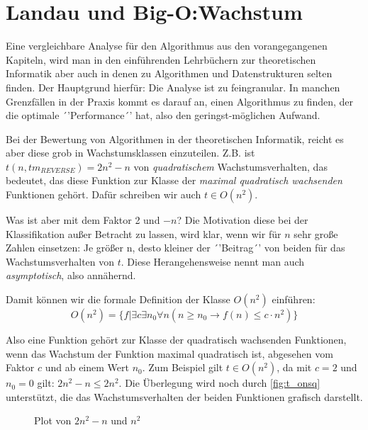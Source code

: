 \section{Landau und Big-O:\@ Wachstum}

Eine vergleichbare Analyse für den Algorithmus aus den vorangegangenen Kapiteln,
wird man in den einführenden Lehrbüchern zur theoretischen Informatik
aber auch in denen zu Algorithmen und Datenstrukturen selten finden.
Der Hauptgrund hierfür: Die Analyse ist zu feingranular.
In manchen Grenzfällen in der Praxis kommt es darauf an,
einen Algorithmus zu finden, der die optimale ´'Performance´' hat,
also den geringst-möglichen Aufwand.

Bei der Bewertung von Algorithmen in der theoretischen Informatik,
reicht es aber diese grob in Wachstumsklassen einzuteilen.
Z.B. ist $t(n, tm_{REVERSE}) = 2n^2 - n$ von \emph{quadratischem} Wachstumsverhalten,
das bedeutet, das diese Funktion zur Klasse der \emph{maximal quadratisch wachsenden}
Funktionen gehört.
Dafür schreiben wir auch $t \in O(n^2)$.

Was ist aber mit dem Faktor 2 und $-n$?
Die Motivation diese bei der Klassifikation außer Betracht zu lassen, wird
klar, wenn wir für $n$ sehr große Zahlen einsetzen:
Je größer n, desto kleiner der ´'Beitrag´' von beiden für das Wachstumsverhalten von $t$.
Diese Herangehensweise nennt man auch \emph{asymptotisch}, also annähernd.

Damit können wir die formale Definition der Klasse $O(n^2)$ einführen:
\[
O(n^2) = \{f|\exists c \exists n_0 \forall n (n \geq n_0 \rightarrow f(n) \leq c \cdot n^2)\}
\]

Also eine Funktion gehört zur Klasse der quadratisch wachsenden Funktionen,
wenn das Wachstum der Funktion maximal quadratisch ist,
abgesehen vom Faktor $c$ und ab einem Wert $n_0$.
Zum Beispiel gilt $t \in O(n^2)$, da mit $c=2$ und $n_0 = 0$ gilt: $2n^2 -n \leq 2n^2$.
Die Überlegung wird noch durch \autoref{fig:t_onsq} unterstützt,
die das Wachstumsverhalten der beiden Funktionen grafisch darstellt.

\begin{figure}[h]
    \caption{Plot von $2n^2 - n$ und $n^2$}
    \centering
    \label{fig:t_onsq}
\end{figure}


